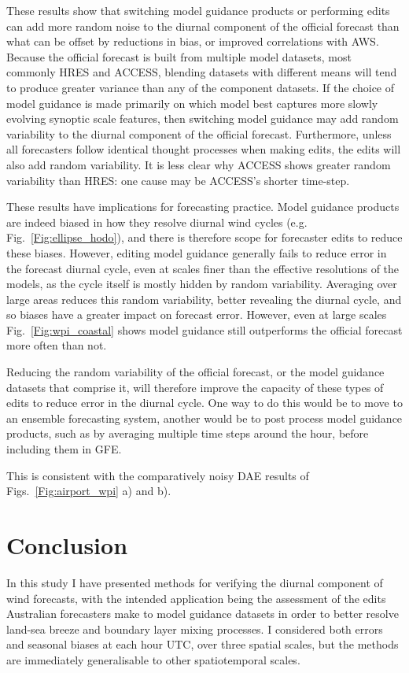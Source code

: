 \documentclass[twocol]{ametsoc}
\begin{document}
These results show that switching model guidance products or performing edits can add more random noise to the diurnal component of the official forecast than what can be offset by reductions in bias, or improved correlations with AWS. Because the official forecast is built from multiple model datasets, most commonly HRES and ACCESS, blending datasets with different means will tend to produce greater variance than any of the component datasets. If the choice of model guidance is made primarily on which model best captures more slowly evolving synoptic scale features, then switching model guidance may add random variability to the diurnal component of the official forecast. Furthermore, unless all forecasters follow identical thought processes when making edits, the edits will also add random variability. It is less clear why ACCESS shows greater random variability than HRES: one cause may be ACCESS's shorter time-step.  

These results have implications for forecasting practice. Model guidance products are indeed biased in how they resolve diurnal wind cycles (e.g. Fig.~\ref{Fig:ellipse_hodo}), and there is therefore scope for forecaster edits to reduce these biases. However, editing model guidance generally fails to reduce error in the forecast diurnal cycle, even at scales finer than the effective resolutions of the models, as the cycle itself is mostly hidden by random variability. Averaging over large areas reduces this random variability, better revealing the diurnal cycle, and so biases have a greater impact on forecast error. However, even at large scales Fig.~\ref{Fig:wpi_coastal} shows model guidance still outperforms the official forecast more often than not. 

Reducing the random variability of the official forecast, or the model guidance datasets that comprise it, will therefore improve the capacity of these types of edits to reduce error in the diurnal cycle. One way to do this would be to move to an ensemble forecasting system, another would be to post process model guidance products, such as by averaging multiple time steps around the hour, before including them in GFE. 

This is consistent with the comparatively noisy DAE results of Figs.~\ref{Fig:airport_wpi} a) and b). 

\section{Conclusion}
\label{Sec:Conclusion}
In this study I have presented methods for verifying the diurnal component of wind forecasts, with the intended application being the assessment of the edits Australian forecasters make to model guidance datasets in order to better resolve land-sea breeze and boundary layer mixing processes. I considered both errors and seasonal biases at each hour UTC, over three spatial scales, but the methods are immediately generalisable to other spatiotemporal scales. 
\end{document}
